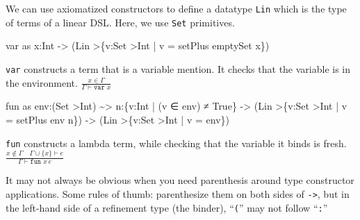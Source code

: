 \documentclass[
]{darts-v2021}
\newenvironment{Shaded}{}{}
\newcommand{\DataTypeTok}[1]{\textcolor[rgb]{0.56,0.13,0.00}{#1}}
\newcommand{\NormalTok}[1]{#1}
\newcommand{\OperatorTok}[1]{\textcolor[rgb]{0.40,0.40,0.40}{#1}}
\newcommand{\OtherTok}[1]{\textcolor[rgb]{0.00,0.44,0.13}{#1}}
\renewenvironment{quote}{\begin{myquote}}{\end{myquote}}
\begin{document}
We can use axiomatized constructors to define a datatype \texttt{Lin}
which is the type of terms of a linear DSL. Here, we use \texttt{Set}
primitives.

\begin{Shaded}
\begin{Highlighting}[numbers=left,,firstnumber=4,]
\NormalTok{var as x}\OperatorTok{:}\DataTypeTok{Int} \OtherTok{{-}\textgreater{}}\NormalTok{ (}\DataTypeTok{Lin} \OperatorTok{\textgreater{}}\NormalTok{\{v}\OperatorTok{:}\DataTypeTok{Set} \OperatorTok{\textgreater{}}\DataTypeTok{Int} \OperatorTok{|}\NormalTok{ v }\OtherTok{=}\NormalTok{ setPlus emptySet x\})}
\end{Highlighting}
\end{Shaded}

\texttt{var} constructs a term that is a variable mention. It checks
that the variable is in the environment.
\(\frac{x \in \Gamma}{\Gamma \vdash \texttt{var } x}\)

\begin{Shaded}
\begin{Highlighting}[numbers=left,,firstnumber=7,]
\NormalTok{fun as env}\OperatorTok{:}\NormalTok{(}\DataTypeTok{Set} \OperatorTok{\textgreater{}}\DataTypeTok{Int}\NormalTok{) }\OperatorTok{\textasciitilde{}\textgreater{}}
\NormalTok{  n}\OperatorTok{:}\NormalTok{\{v}\OperatorTok{:}\DataTypeTok{Int} \OperatorTok{|}\NormalTok{ (v ∈ env) ≠ }\DataTypeTok{True}\NormalTok{\}}
  \OtherTok{{-}\textgreater{}}\NormalTok{ (}\DataTypeTok{Lin} \OperatorTok{\textgreater{}}\NormalTok{\{v}\OperatorTok{:}\DataTypeTok{Set} \OperatorTok{\textgreater{}}\DataTypeTok{Int} \OperatorTok{|}\NormalTok{ v }\OtherTok{=}\NormalTok{ setPlus env n\})}
  \OtherTok{{-}\textgreater{}}\NormalTok{ (}\DataTypeTok{Lin} \OperatorTok{\textgreater{}}\NormalTok{\{v}\OperatorTok{:}\DataTypeTok{Set} \OperatorTok{\textgreater{}}\DataTypeTok{Int} \OperatorTok{|}\NormalTok{ v }\OtherTok{=}\NormalTok{ env\})}
\end{Highlighting}
\end{Shaded}

\texttt{fun} constructs a lambda term, while checking that the variable
it binds is fresh.
\(\frac{x\not\in\Gamma \quad \Gamma \cup \{x\} \vdash e}{\Gamma \vdash \texttt{fun } x\, e}\)

\begin{quote}
It may not always be obvious when you need parenthesis around type
constructor applications. Some rules of thumb: parenthesize them on both
sides of \texttt{-\textgreater{}}, but in the left-hand side of a
refinement type (the binder), ``\texttt{(}'' may not follow
``\texttt{:}''
\end{quote}
\end{document}

